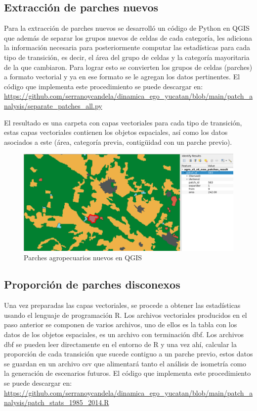 \documentclass[12pt,a4paper,oldfontcommands]{article}
\begin{document}
\subsection{Extracción de parches nuevos}
Para la extracción de parches nuevos se desarrolló un código de Python en QGIS que además de separar los grupos nuevos de celdas de cada categoría, les adiciona la información necesaria para posteriormente computar las estadísticas para cada tipo de transición, es decir, el área del grupo de celdas y la categoría mayoritaria de la que cambiaron. Para lograr esto se convierten los grupos de celdas (parches) a formato vectorial y ya en ese formato se le agregan los datos pertinentes. El código que implementa este procedimiento se puede descargar en: \url{https://github.com/serranoycandela/dinamica_ego_yucatan/blob/main/patch_analysis/separate_patches_all.py}

El resultado es una carpeta con capas vectoriales para cada tipo de transición, estas capas vectoriales contienen los objetos espaciales, así como los datos asociados a este (área, categoría previa, contigüidad con un parche previo). 

\begin{figure}[h]
	\centering
	\includegraphics[width=1\textwidth]{./figuras/parches.png}
	\caption{Parches agropecuarios nuevos en QGIS}
	\label{fig:parches}
\end{figure}


\subsection{Proporción de parches disconexos}
Una vez preparadas las capas vectoriales, se procede a obtener las estadísticas usando el lenguaje de programación R. Los archivos vectoriales producidos en el paso anterior se componen de varios archivos, uno de ellos es la tabla con los datos de los objetos espaciales, es un archivo con terminación dbf. Los archivos dbf se pueden leer directamente en el entorno de R y una vez ahí, calcular la proporción de cada transición que sucede contiguo a un parche previo, estos datos se guardan en un archivo csv que alimentará tanto el análisis de isometría como la generación de escenarios futuros. El código que implementa este procedimiento se puede descargar en:  \url{https://github.com/serranoycandela/dinamica_ego_yucatan/blob/main/patch_analysis/patch_stats_1985_2014.R}
\end{document}
